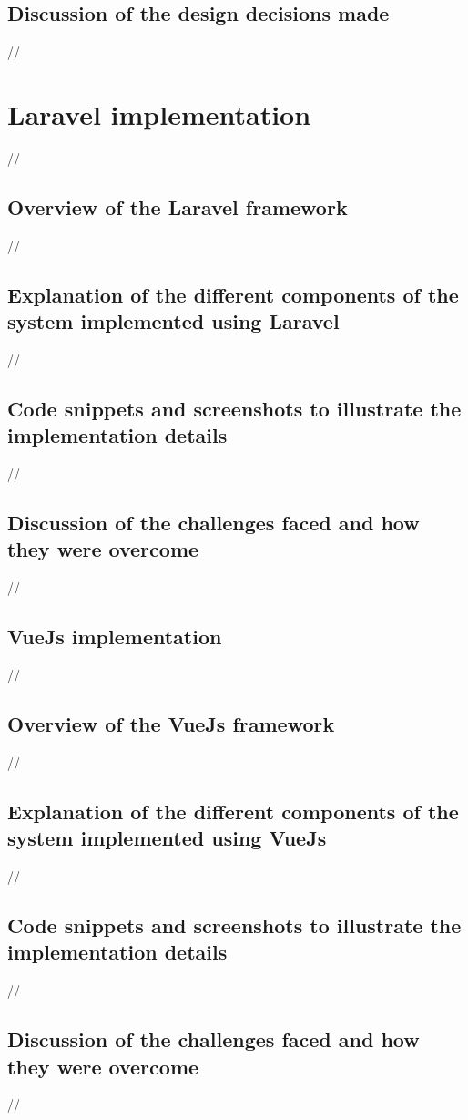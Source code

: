 \subsection {Discussion of the design decisions made}

//

\section {Laravel implementation}
//
\subsection {Overview of the Laravel framework}
//
\subsection {Explanation of the different components of the system implemented using Laravel}
//
\subsection {Code snippets and screenshots to illustrate the implementation details}
//
\subsection {Discussion of the challenges faced and how they were overcome}

//

\subsection {VueJs implementation}
//
\subsection {Overview of the VueJs framework}
//
\subsection {Explanation of the different components of the system implemented using VueJs}
//
\subsection {Code snippets and screenshots to illustrate the implementation details}
//
\subsection {Discussion of the challenges faced and how they were overcome}
//


